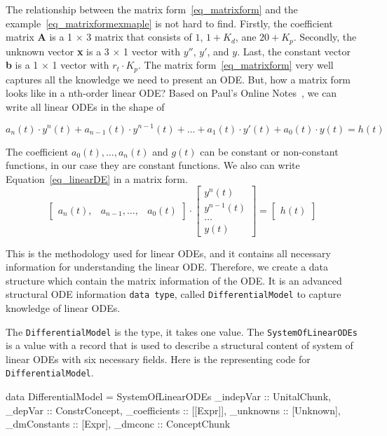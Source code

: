 The relationship between the matrix form~\ref{eq_matrixform} and the example~\ref{eq_matrixformexmaple} is not hard to find. Firstly, the coefficient matrix \textbf{A} is a 1 $\times$ 3 matrix that consists of $1$, $1 + K_d$, ane $20 + K_p$. Secondly, the unknown vector \textbf{x} is a 3 $\times$ 1 vector with $y''$, $y'$, and $y$. Last, the constant vector \textbf{b} is a 1 $\times$ 1 vector with $r_t \cdot K_p$. The matrix form~\ref{eq_matrixform} very well captures all the knowledge we need to present an ODE. But, how a matrix form looks like in a nth-order linear ODE? Based on Paul's Online Notes~\citep{paullinearode}, we can write all linear ODEs in the shape of

\begin{equation} \label{eq_linearDE}
	a_n(t) \cdot y^n(t) + a_{n-1}(t) \cdot y^{n-1}(t) + \dots + a_1(t) \cdot y'(t) + a_0(t) \cdot y(t) = h(t)
\end{equation}

The coefficient $a_0(t), \dots, a_n(t)$ and $g(t)$ can be constant or non-constant functions, in our case they are constant functions. We also can write Equation~\ref{eq_linearDE} in a matrix form. 
\begin{equation} \label{eq_matrixnthorder}
	\begin{bmatrix}
		a_n(t), & a_{n-1}, \dots, & a_0(t)
	\end{bmatrix}
	\cdot
	\begin{bmatrix}
		y^{n}(t) \\
		y^{n-1}(t) \\
		\dots \\
		y(t)  
	\end{bmatrix}
	=
	\begin{bmatrix}
		h(t)
	\end{bmatrix}
\end{equation}

This is the methodology used for linear ODEs, and it contains all necessary information for understanding the linear ODE. Therefore, we create a data structure which contain the matrix information of the ODE. It is an advanced structural ODE information \verb|data type|, called \verb|DifferentialModel| to capture knowledge of linear ODEs.

The \verb|DifferentialModel| is the type, it takes one value. The \verb|SystemOfLinearODEs| is a value with a record that is used to describe a structural content of system of linear ODEs with six necessary fields. Here is the representing code for \verb|DifferentialModel|.
\begin{haskell1}
data DifferentialModel = SystemOfLinearODEs {
	_indepVar :: UnitalChunk,
	_depVar :: ConstrConcept,
	_coefficients :: [[Expr]],
	_unknowns :: [Unknown],
	_dmConstants :: [Expr],
	_dmconc :: ConceptChunk
}
\end{haskell1}

